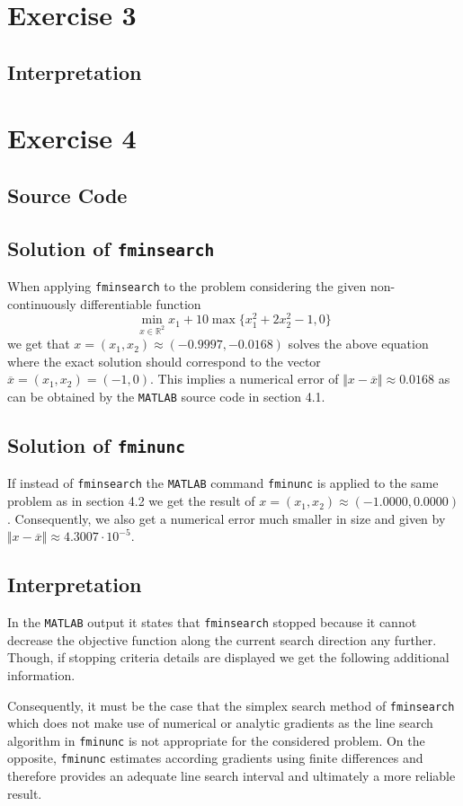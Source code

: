 \documentclass{article}
\begin{document}
    
	
	\section{Exercise 3}
	\subsection{Interpretation}
	
	
	\section{Exercise 4}
	\subsection{Source Code}
	
	
	\subsection{Solution of \texttt{fminsearch}}
	When applying \texttt{fminsearch} to the problem considering the given non-continuously differentiable function 
	\begin{equation*}
		\min_{x\in\mathbb{R}^2}x_1+10\max\{x_1^2+2x_2^2-1,0\}
	\end{equation*}
	we get that $x=(x_1,x_2)\approx(-0.9997,-0.0168)$ solves the above equation where the exact solution should correspond to the vector $\overline{x}=(x_1,x_2)=(-1,0)$. This implies a numerical error of $\Vert x - \overline{x}\Vert \approx 0.0168$ as can be obtained by the \texttt{MATLAB} source code in section 4.1.
	\subsection{Solution of \texttt{fminunc}}
	If instead of \texttt{fminsearch} the \texttt{MATLAB} command \texttt{fminunc} is applied to the same problem as in section 4.2 we get the result of $x=(x_1,x_2)\approx(-1.0000,0.0000)$. Consequently, we also get a numerical error much smaller in size and given by $\Vert x - \overline{x}\Vert \approx 4.3007\cdot 10^{-5}$.
	\subsection{Interpretation}
	In the \texttt{MATLAB} output it states that \texttt{fminsearch} stopped because it cannot decrease the objective function along the current search direction any further. Though, if stopping criteria details are displayed we get the following additional information.
	
	Consequently, it must be the case that the simplex search method of \texttt{fminsearch} which does not make use of numerical or analytic gradients as the line search algorithm in \texttt{fminunc} is not appropriate for the considered problem. On the opposite, \texttt{fminunc} estimates according gradients using finite differences and therefore provides an adequate line search interval and ultimately a more reliable result.
\end{document}
